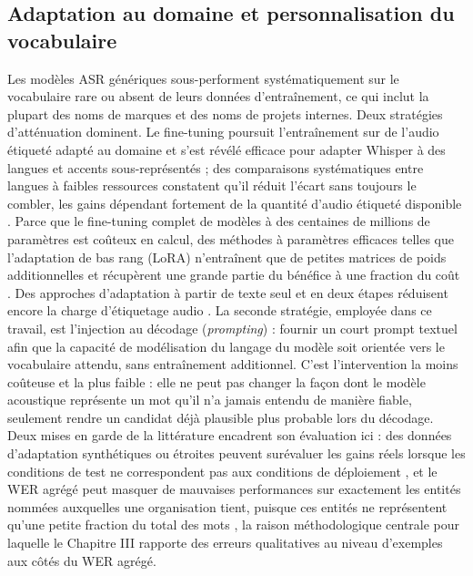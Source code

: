 \documentclass[12pt]{report}
\begin{document}
\subsection{Adaptation au domaine et personnalisation du vocabulaire}
Les modèles ASR génériques sous-performent systématiquement sur le vocabulaire rare ou absent de leurs données d'entraînement, ce qui inclut la plupart des noms de marques et des noms de projets internes. Deux stratégies d'atténuation dominent. Le fine-tuning poursuit l'entraînement sur de l'audio étiqueté adapté au domaine et s'est révélé efficace pour adapter Whisper à des langues et accents sous-représentés \cite{daouad2024optimizing,polat2024implementation} ; des comparaisons systématiques entre langues à faibles ressources constatent qu'il réduit l'écart sans toujours le combler, les gains dépendant fortement de la quantité d'audio étiqueté disponible \cite{whisperfinetune2024}. Parce que le fine-tuning complet de modèles à des centaines de millions de paramètres est coûteux en calcul, des méthodes à paramètres efficaces telles que l'adaptation de bas rang (LoRA) n'entraînent que de petites matrices de poids additionnelles et récupèrent une grande partie du bénéfice à une fraction du coût \cite{ankita2026exploring}. Des approches d'adaptation à partir de texte seul et en deux étapes réduisent encore la charge d'étiquetage audio \cite{fang2025textonly,zheng2026twostage}. La seconde stratégie, employée dans ce travail, est l'injection au décodage (\textit{prompting}) : fournir un court prompt textuel afin que la capacité de modélisation du langage du modèle soit orientée vers le vocabulaire attendu, sans entraînement additionnel. C'est l'intervention la moins coûteuse et la plus faible : elle ne peut pas changer la façon dont le modèle acoustique représente un mot qu'il n'a jamais entendu de manière fiable, seulement rendre un candidat déjà plausible plus probable lors du décodage. Deux mises en garde de la littérature encadrent son évaluation ici : des données d'adaptation synthétiques ou étroites peuvent surévaluer les gains réels lorsque les conditions de test ne correspondent pas aux conditions de déploiement \cite{tran2025das}, et le WER agrégé peut masquer de mauvaises performances sur exactement les entités nommées auxquelles une organisation tient, puisque ces entités ne représentent qu'une petite fraction du total des mots \cite{durmus2026contextual}, la raison méthodologique centrale pour laquelle le Chapitre III rapporte des erreurs qualitatives au niveau d'exemples aux côtés du WER agrégé.
\end{document}
